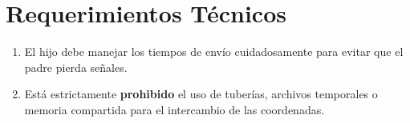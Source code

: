 \documentclass[12pt,a4paper]{article}
\begin{document}
\section*{Requerimientos Técnicos}
\begin{enumerate}
    \item El hijo debe manejar los tiempos de envío cuidadosamente para evitar que el padre pierda señales.
    \item Está estrictamente \textbf{prohibido} el uso de tuberías, archivos temporales o memoria compartida para el intercambio de las coordenadas.
\end{enumerate}
\end{document}

